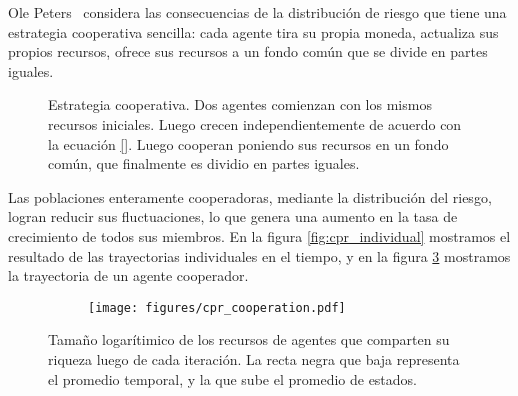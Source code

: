 \documentclass[a4paper,10pt]{article}
\begin{document}
Ole Peters~\cite{peters2015-evolutionaryAdvantageOfCooperation} considera las consecuencias de la distribución de riesgo que tiene una estrategia cooperativa sencilla: cada agente tira su propia moneda, actualiza sus propios recursos, ofrece sus recursos a un fondo común que se divide en partes iguales.

\begin{figure}[H]
\centering
{}
\caption{Estrategia cooperativa. Dos agentes comienzan con los mismos recursos iniciales. Luego crecen independientemente de acuerdo con la ecuaci\'on \ref{}. Luego cooperan poniendo sus recursos en un fondo común, que finalmente es dividio en partes iguales.}
\label{fig:protocolo}
\end{figure}

Las poblaciones enteramente cooperadoras, mediante la distribución del riesgo, logran reducir sus fluctuaciones, lo que genera una aumento en la tasa de crecimiento de todos sus miembros.
En la figura \ref{fig:cpr_individual} mostramos el resultado de las trayectorias individuales en el tiempo, y en la figura \ref{fig:cpr_cooperation} mostramos la trayectoria de un agente cooperador.
\begin{figure}[ht!]
    \centering
    \begin{subfigure}[b]{0.45\textwidth}
    \texttt{[image: figures/cpr\_cooperation.pdf]}
    \caption{}
    \label{fig:cpr_cooperation}
    \end{subfigure}
    \caption{
    Tamaño logarítimico de los recursos de agentes que comparten su riqueza luego de cada iteración.
    La recta negra que baja representa el promedio temporal, y la que sube el promedio de estados.
    }
    \label{fig:cpr_cooperation}
\end{figure}
\end{document}
